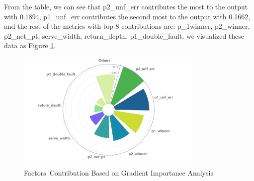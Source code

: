 


From the table, we can see that p2\_unf\_err contributes the most to the output with 0.1894, p1\_unf\_err contributes the second most to the output with 0.1662, and the rest of the metrics with top 8 contributions are: p\_1winner, p2\_winner, p2\_net\_pt, serve\_width, return\_depth, p1\_double\_fault. we visualized these data as Figure \ref{fig:gradients_pie}.



\begin{figure}[htbp]
    \centering
    \includegraphics[width=0.8\textwidth]{figure/bar-polar-label-radial.png}
    \caption{ Factors\textquotesingle~Contribution Based on Gradient Importance Analysis
    \textnormal{}}
    \label{fig:gradients_pie}
\end{figure}

